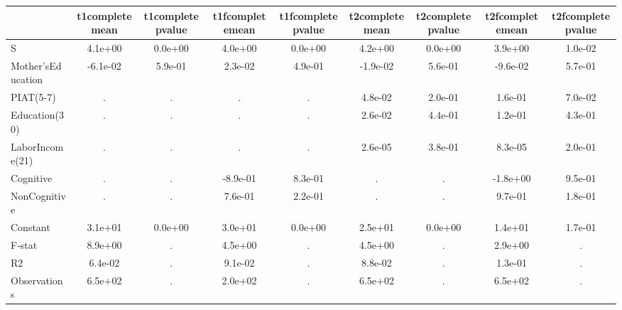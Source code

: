 \begin{table}[htbp]
\begin{tabular}{lcccccccc} \hline \hline
 & t1completemean  & t1completepvalue  & t1fcompletemean  & t1fcompletepvalue  & t2completemean  & t2completepvalue  & t2fcompletemean  & t2fcompletepvalue  \\  \hline 
S &  4.1e+00 &  0.0e+00 &  4.0e+00 &  0.0e+00 &  4.2e+00 &  0.0e+00 &  3.9e+00 &  1.0e-02 \\  
Mother'sEducation & -6.1e-02 &  5.9e-01 &  2.3e-02 &  4.9e-01 & -1.9e-02 &  5.6e-01 & -9.6e-02 &  5.7e-01 \\  
PIAT(5-7) &         . &         . &         . &         . &  4.8e-02 &  2.0e-01 &  1.6e-01 &  7.0e-02 \\  
Education(30) &         . &         . &         . &         . &  2.6e-02 &  4.4e-01 &  1.2e-01 &  4.3e-01 \\  
LaborIncome(21) &         . &         . &         . &         . &  2.6e-05 &  3.8e-01 &  8.3e-05 &  2.0e-01 \\  
Cognitive &         . &         . & -8.9e-01 &  8.3e-01 &         . &         . & -1.8e+00 &  9.5e-01 \\  
NonCognitive &         . &         . &  7.6e-01 &  2.2e-01 &         . &         . &  9.7e-01 &  1.8e-01 \\  
Constant &  3.1e+01 &  0.0e+00 &  3.0e+01 &  0.0e+00 &  2.5e+01 &  0.0e+00 &  1.4e+01 &  1.7e-01 \\  
F-stat &  8.9e+00 &         . &  4.5e+00 &         . &  4.5e+00 &         . &  2.9e+00 &         . \\  
R2 &  6.4e-02 &         . &  9.1e-02 &         . &  8.8e-02 &         . &  1.3e-01 &         . \\  
Observations &  6.5e+02 &         . &  2.0e+02 &         . &  6.5e+02 &         . &  6.5e+02 &         . \\  
\hline \hline \end{tabular}
\end{table}
